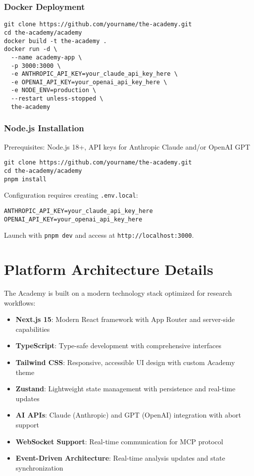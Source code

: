 \documentclass[11pt,letterpaper]{article}
\newcommand{\theacademy}{The Academy}
\begin{document}
\subsubsection{Docker Deployment}
\begin{verbatim}
git clone https://github.com/yourname/the-academy.git
cd the-academy/academy
docker build -t the-academy .
docker run -d \
  --name academy-app \
  -p 3000:3000 \
  -e ANTHROPIC_API_KEY=your_claude_api_key_here \
  -e OPENAI_API_KEY=your_openai_api_key_here \
  -e NODE_ENV=production \
  --restart unless-stopped \
  the-academy
\end{verbatim}

\subsubsection{Node.js Installation}
Prerequisites: Node.js 18+, API keys for Anthropic Claude and/or OpenAI GPT

\begin{verbatim}
git clone https://github.com/yourname/the-academy.git
cd the-academy/academy
pnpm install
\end{verbatim}

Configuration requires creating \texttt{.env.local}:
\begin{verbatim}
ANTHROPIC_API_KEY=your_claude_api_key_here
OPENAI_API_KEY=your_openai_api_key_here
\end{verbatim}

Launch with \texttt{pnpm dev} and access at \texttt{http://localhost:3000}.

\section{Platform Architecture Details}
\label{app:architecture}

\theacademy{} is built on a modern technology stack optimized for research workflows:

\begin{itemize}
    \item \textbf{Next.js 15}: Modern React framework with App Router and server-side capabilities
    \item \textbf{TypeScript}: Type-safe development with comprehensive interfaces
    \item \textbf{Tailwind CSS}: Responsive, accessible UI design with custom Academy theme
    \item \textbf{Zustand}: Lightweight state management with persistence and real-time updates
    \item \textbf{AI APIs}: Claude (Anthropic) and GPT (OpenAI) integration with abort support
    \item \textbf{WebSocket Support}: Real-time communication for MCP protocol
    \item \textbf{Event-Driven Architecture}: Real-time analysis updates and state synchronization
\end{itemize}
\end{document}
